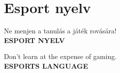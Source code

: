 \documentclass[a4paper]{article}
\theoremstyle{definition}
\begin{document}
\section{Esport nyelv}






\begin{titlepage}
\pagecolor{cyan}
	\centering	

	\vspace{1cm}
	{\color{gray!10!white}\Large Ne menjen a tanulás a játék rovására!}
	\\
	\vspace{1cm}
	{\color{black!20!white}\Huge\bf ESPORT NYELV}

\vspace*{\fill}

	{\color{gray!10!white}\Large Don't learn at the expense of gaming.}
	\vspace{1cm}
\\	
	
	{\color{black!20!white}\Huge\bf ESPORTS LANGUAGE}
	\vspace{1cm}
	\end{titlepage}
\end{document}
